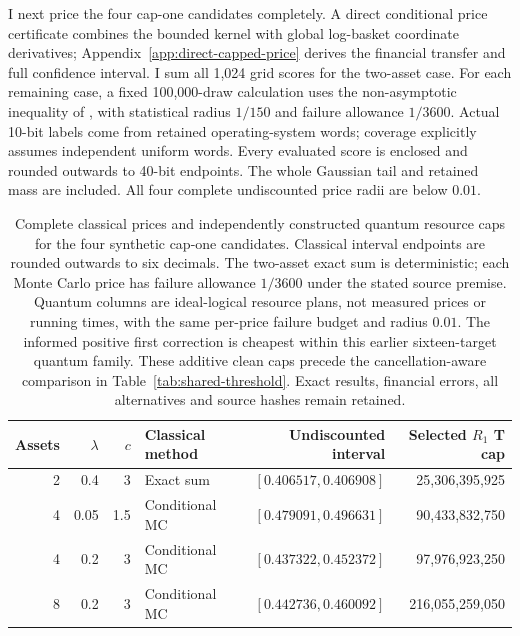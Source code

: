 \documentclass[11pt]{article}
\begin{document}
I next price the four cap-one candidates completely. A direct conditional
price certificate combines the bounded kernel with global log-basket
coordinate derivatives; Appendix~\ref{app:direct-capped-price} derives the
financial transfer and full confidence interval. I sum all 1,024 grid scores
for the two-asset case. For each remaining case, a fixed 100,000-draw
calculation uses the non-asymptotic inequality of \citet{hoeffding1963},
with statistical radius $1/150$ and failure allowance $1/3600$.
Actual 10-bit labels come from retained operating-system words; coverage
explicitly assumes independent uniform words. Every evaluated score is
enclosed and rounded outwards to 40-bit endpoints. The whole Gaussian
tail and retained mass are included. All four complete undiscounted price
radii are below $0.01$.

\begin{table}[ht]
\centering\small
\begin{tabular}{rrrlrr}
\toprule
Assets&$\lambda$&$c$&Classical method&Undiscounted interval&Selected $R_1$ T cap\\
\midrule
2&0.4&3&Exact sum&$[0.406517,0.406908]$&25,306,395,925\\
4&0.05&1.5&Conditional MC&$[0.479091,0.496631]$&90,433,832,750\\
4&0.2&3&Conditional MC&$[0.437322,0.452372]$&97,976,923,250\\
8&0.2&3&Conditional MC&$[0.442736,0.460092]$&216,055,259,050\\
\bottomrule
\end{tabular}
\caption{Complete classical prices and independently constructed quantum
resource caps for the four synthetic cap-one candidates. Classical interval
endpoints are rounded outwards to six decimals. The two-asset exact sum is
deterministic; each Monte Carlo price has failure allowance $1/3600$ under
the stated source premise. Quantum columns are ideal-logical resource plans,
not measured prices or running times, with the same per-price failure
budget and radius $0.01$. The informed positive first correction is cheapest
within this earlier sixteen-target quantum family. These additive clean
caps precede the cancellation-aware comparison in Table~\ref{tab:shared-threshold}. Exact results,
financial errors, all alternatives and source hashes remain retained.}
\label{tab:four-complete-prices}
\end{table}
\end{document}
